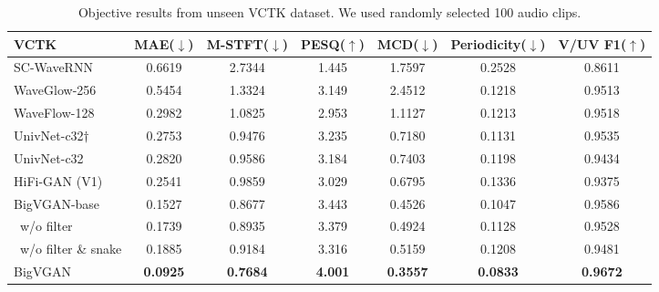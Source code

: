 \documentclass{article} \usepackage{iclr2023_conference,times}
\theoremstyle{plain}
\theoremstyle{definition}
\theoremstyle{remark}
\begin{document}
\begin{table*}[h]
\caption{\footnotesize
Objective results from unseen VCTK dataset. We used randomly selected 100 audio clips. 
}
\label{vctk}
\vspace{-0.05cm}
\begin{center}
\begin{small}
\begin{adjustbox}{width=0.9\textwidth}
\begin{tabular}{l|cccccc}
\toprule
VCTK  & MAE($\downarrow$) & M-STFT($\downarrow$) & PESQ($\uparrow$) & MCD($\downarrow$) & Periodicity($\downarrow$) & V/UV F1($\uparrow$)\\
\midrule
SC-WaveRNN & 0.6619 & 2.7344 & 1.445 & 1.7597 & 0.2528 & 0.8611 \\
WaveGlow-256 & 0.5454 & 1.3324 & 3.149 & 2.4512 & 0.1218 & 0.9513 \\
WaveFlow-128 & 0.2982 & 1.0825 & 2.953 & 1.1127 & 0.1213 & 0.9518 \\
UnivNet-c32$\dagger$  & 0.2753 & 0.9476 & 3.235 & 0.7180 & 0.1131 & 0.9535 \\
UnivNet-c32  & 0.2820 & 0.9586 & 3.184 & 0.7403 & 0.1198 & 0.9434 \\
HiFi-GAN (V1)   & 0.2541 & 0.9859 & 3.029 & 0.6795 & 0.1336 & 0.9375  \\
\midrule
BigVGAN-base    & 0.1527 & 0.8677 & 3.443 & 0.4526 & 0.1047 & 0.9586 \\
\ w/o filter    & 0.1739 & 0.8935 & 3.379 & 0.4924 & 0.1128 & 0.9528 \\
\ w/o filter \& snake    & 0.1885 & 0.9184 & 3.316 & 0.5159 & 0.1208 & 0.9481 \\
\midrule
BigVGAN    & \textbf{0.0925} & \textbf{0.7684} & \textbf{4.001} & \textbf{0.3557} & \textbf{0.0833} & \textbf{0.9672} \\
\bottomrule
\end{tabular}
\end{adjustbox}
\end{small}
\end{center}
\vskip -0.1in
\end{table*}
\end{document}
